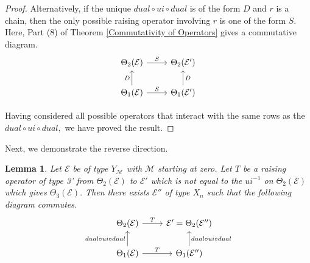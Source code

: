 \documentclass[11pt,letterpaper]{amsart}
\newcommand{\EE}{\mathcal{E}}
\newtheorem{lemma}[thm]{Lemma}
\numberwithin{equation}{section}
\begin{document}
\begin{proof}
    Alternatively, if the unique $dual \circ ui \circ dual$ is of the form $D$ and $r$ is a chain, then the only possible raising operator involving $r$ is one of the form $S.$ Here, Part (8) of Theorem \ref{Commutativity of Operators} gives a commutative diagram.
    \[\begin{tikzcd}
	{\Theta_2(\EE)} & {\Theta_2(\EE')} \\
	{\Theta_1(\EE)} & {\Theta_1(\EE')}
	\arrow["S", from=1-1, to=1-2]
	\arrow["D", from=2-1, to=1-1]
	\arrow["S", from=2-1, to=2-2]
	\arrow["D"', from=2-2, to=1-2]
\end{tikzcd}\]

    Having considered all possible operators that interact with the same rows as the $dual \circ ui \circ dual,$ we have proved the result.
\end{proof}

Next, we demonstrate the reverse direction.

\begin{lemma}
\label{commute 2 to 1}
    Let $\EE$ be of type $Y_\mathcal{M}$ with $\mathcal{M}$ starting at zero. Let $T$ be a raising operator of type 3' from $\Theta_2(\EE)$ to $\EE'$ which is not equal to the $ui^{-1}$ on $\Theta_2(\EE)$ which gives $\Theta_3(\EE).$ Then there exists $\EE''$ of type $X_n$ such that the following diagram commutes.
\[\begin{tikzcd}
	{\Theta_2(\EE)} & {\EE' = \Theta_2(\EE'')} \\
	{\Theta_1(\EE)} & {\Theta_1(\EE'')}
	\arrow["T", from=1-1, to=1-2]
	\arrow["{dual \circ ui \circ dual}", from=2-1, to=1-1]
	\arrow["T", from=2-1, to=2-2]
	\arrow["{dual \circ ui \circ dual}"', from=2-2, to=1-2]
\end{tikzcd}\]
\end{lemma}
\end{document}
